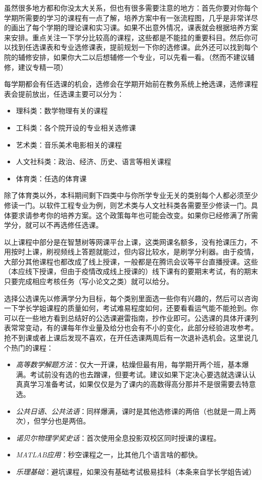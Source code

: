 虽然很多地方都和你没太大关系，但也有很多需要注意的地方：首先你要对你每个学期所需要的学习的课程有一点了解，培养方案中有一张流程图，几乎是非常详尽的画出了每个学期的理论课和实习课。如果不出意外情况，课表就会根据培养方案来安排。重点关注一下学分比较高的课程，这些都是不能挂的重要科目。然后你可以找到任选课表和专业选修课表，提前规划一下你的选修课。此外还可以找到每个院的辅修安排，如果你大二以后想辅修一个专业，可以先看一看。（然而不建议辅修，建议专精一项）


每学期都会有任选课的机会，选修会在学期开始前在教务系统上\sout{抢}选课，选修课程表会提前放出，任选课主要可以分为：
\begin{itemize}
    \itshape
    \item 理科类：数学物理有关的课程
    \item 工科类：各个院开设的专业相关选修课
    \item 艺术类：音乐美术电影相关的课程
    \item 人文社科类：政治、经济、历史、语言等相关课程
    \item 体育类：任选的体育课
\end{itemize}

除了体育类以外，本科期间剩下四类中与你所学专业无关的类别每个人都必须至少修读一门。以软件工程专业为例，则艺术类与人文社科类各需要至少修读一门。具体要求请参考你的培养方案。这个政策每年也可能会改变。如果你已经修满了所需学分，就可以不再选修任选课。

以上课程中部分是在智慧树等网课平台上课，这类网课名额多，没有抢课压力，不用按时上课，刷视频线上答题就能过，但内容比较水，是刷学分利器。由于疫情，大部分其他课程也都改成了线上授课，一般都是在腾讯会议等平台直播授课。这些（本应线下授课，但由于疫情改成线上授课的）线下课有的要期末考试，有的期末只要完成相应考核任务（写小论文之类）就可以给分。

选择公选课先以修满学分为目标，每个类别里面选一些你有兴趣的，然后可以咨询一下学长学姐课程的质量如何，考试难易程度如何，还要看看运气能不能抢到。你可以在一些地方看到总结好的公选课避雷指南，抄作业即可。公选课的具体开课列表常常变动，有的课每年作业量及给分也会有不小的变化，此部分经验进攻参考。抢不到课或者上课后发现不喜欢，在开任选课两周后有一次退补选机会。这里说几个热门的课程：

\begin{itemize}
    \itshape
    \item \emph{高等数学解题方法}：仅大一开课，枯燥但最有用，每学期开两个班，基本爆满。考试前没有选的也去蹭课，但要考试。建议如果下定决心要选就选课认认真真学习准备考试，如果仅仅是为了课内的高数得高分那并不是很需要去特意选。
    \item \emph{公共日语}、\emph{公共法语}：同样爆满，课时是其他选修课的两倍（也就是一周上两次），但学分也是两倍。
    \item \emph{诺贝尔物理学奖史话}：首次使用全息投影双校区同时授课的课程。
    \item \emph{MATLAB应用}：秒空课程之一，比其他几个语言啥的都快。
    \item \emph{乐理基础}：避坑课程，如果没有基础考试极易挂科（本条来自学长学姐告诫）
\end{itemize}


